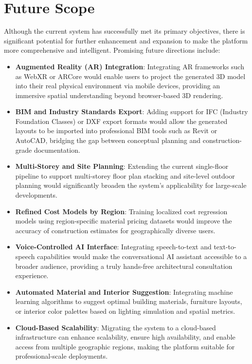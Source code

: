 \documentclass[12pt]{report}
\begin{document}
\chapter{Future Scope}

Although the current system has successfully met its primary objectives, there is significant potential for further enhancement and expansion to make the platform more comprehensive and intelligent\cite{eastman2018, brown2020}. Promising future directions include:

\begin{itemize}
    \item \textbf{Augmented Reality (AR) Integration}: Integrating AR frameworks such as WebXR or ARCore would enable users to project the generated 3D model\cite{threejs2024} into their real physical environment via mobile devices, providing an immersive spatial understanding beyond browser-based 3D rendering\cite{eastman2018}.
    
    \item \textbf{BIM and Industry Standards Export}: Adding support for IFC (Industry Foundation Classes) or DXF export formats would allow the generated layouts to be imported into professional BIM tools such as Revit or AutoCAD\cite{eastman2018}, bridging the gap between conceptual planning and construction-grade documentation.
    
    \item \textbf{Multi-Storey and Site Planning}: Extending the current single-floor pipeline to support multi-storey floor plan stacking and site-level outdoor planning would significantly broaden the system's applicability for large-scale developments\cite{liu2017, chen2019}.
    
    \item \textbf{Refined Cost Models by Region}: Training localized cost regression models\cite{sklearn2024, breiman2001} using region-specific material pricing datasets would improve the accuracy of construction estimates\cite{wang2020} for geographically diverse users.
    
    \item \textbf{Voice-Controlled AI Interface}: Integrating speech-to-text and text-to-speech capabilities would make the conversational AI assistant\cite{groq2024, brown2020} accessible to a broader audience, providing a truly hands-free architectural consultation experience.
    
    \item \textbf{Automated Material and Interior Suggestion}: Integrating machine learning algorithms\cite{sklearn2024} to suggest optimal building materials, furniture layouts, or interior color palettes based on lighting simulation and spatial metrics\cite{wang2020}.
    
    \item \textbf{Cloud-Based Scalability}: Migrating the system to a cloud-based infrastructure can enhance scalability\cite{fastapi2024}, ensure high availability, and enable access from multiple geographic regions, making the platform suitable for professional-scale deployments.
\end{itemize}
\end{document}
